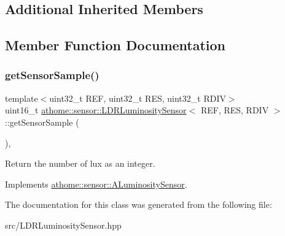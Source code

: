 \subsection*{Additional Inherited Members}


\subsection{Member Function Documentation}
\mbox{\label{classathome_1_1sensor_1_1_l_d_r_luminosity_sensor_a6e4f25000704564ce30a7e3531f23c43}} 
\subsubsection{\texorpdfstring{get\+Sensor\+Sample()}{getSensorSample()}}
{\footnotesize\ttfamily template$<$uint32\+\_\+t R\+EF, uint32\+\_\+t R\+ES, uint32\+\_\+t R\+D\+IV$>$ \\
uint16\+\_\+t \mbox{\hyperlink{classathome_1_1sensor_1_1_l_d_r_luminosity_sensor}{athome\+::sensor\+::\+L\+D\+R\+Luminosity\+Sensor}}$<$ R\+EF, R\+ES, R\+D\+IV $>$\+::get\+Sensor\+Sample (\begin{DoxyParamCaption}{ }\end{DoxyParamCaption})\hspace{0.3cm}{\ttfamily [inline]}, {\ttfamily [virtual]}}

Return the number of lux as an integer. 

Implements \mbox{\hyperlink{classathome_1_1sensor_1_1_a_luminosity_sensor_ae756f7d7647c2cf695305c8f11aec8d3}{athome\+::sensor\+::\+A\+Luminosity\+Sensor}}.



The documentation for this class was generated from the following file\+:\begin{DoxyCompactItemize}
\item 
src/L\+D\+R\+Luminosity\+Sensor.\+hpp\end{DoxyCompactItemize}
